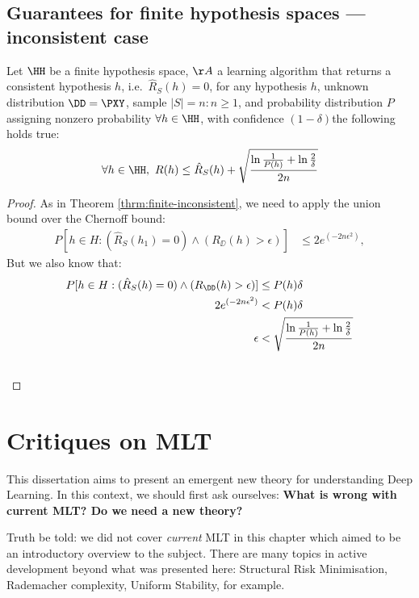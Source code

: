 \subsection{Guarantees for finite hypothesis spaces --- inconsistent case}
\begin{theorem} Let \(\HH\) be a finite hypothesis space, \(\AA\) a learning algorithm that returns a consistent hypothesis \(h\), i.e.\ \(\hat{R}_{S}(h)=0\), for any hypothesis $h$, unknown distribution \(\DD=\PXY\),  sample \(|S|=n: n \geq 1\), and probability distribution $P$ assigning nonzero probability $\forall h \in \HH$, with confidence $(1-\delta)$the following holds true:\\
	\begin{align}
		\forall h \in \HH,~R(h)\leq\hat{R}_{S}(h) + \sqrt{\frac{\ln{\frac{1}{P(h)}}+ \ln{\frac{2}{\delta}}}{2n}}
	\end{align}
\end{theorem}
\begin{proof}
	As in Theorem \ref{thrm:finite-inconsistent}, we need to apply the union bound over the Chernoff bound:
	\begin{align}
		P[h \in H: (\hat{R}_{S}(h_1)=0) \land (R_{\DD}(h)>\epsilon)] &\leq 2e^{(-2n\epsilon^2)},
	\end{align}
	But we also know that:
	\begin{align}
		P[h \in H: (\hat{R}_{S}(h)=0) \land (R_{\DD}(h)>\epsilon)] &\leq P(h)\delta \\
		2e^{(-2n\epsilon^2)} &< P(h) \delta\\
		\epsilon &< \sqrt{\frac{\ln{\frac{1}{P(h)}}+ \ln{\frac{2}{\delta}}}{2n}}\\
		\nonumber \qedhere
	\end{align}
\end{proof}

\section{Critiques on MLT}
This dissertation aims to present an emergent new theory for understanding Deep Learning. In this context, we should first ask ourselves:  \textbf{What is wrong with current \ac{MLT}? Do we need a new theory?}

Truth be told: we did not cover \emph{current} \ac{MLT} in this chapter which aimed to be an introductory overview to the subject. There are many topics in active development beyond what was presented here: Structural Risk Minimisation, Rademacher complexity, Uniform Stability, for example.

